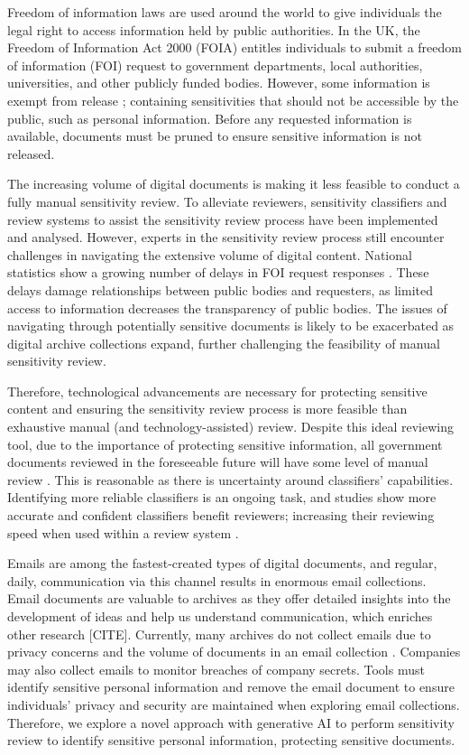 Freedom of information laws are used around the world to give individuals the legal right to access information held by public authorities. In the UK, the Freedom of Information Act 2000 (FOIA) \cite{FOIA:00} entitles individuals to submit a freedom of information (FOI) request to government departments, local authorities, universities, and other publicly funded bodies. However, some information is exempt from release \cite{FOIA:00}; containing sensitivities that should not be accessible by the public, such as personal information. Before any requested information is available, documents must be pruned to ensure sensitive information is not released.

The increasing volume of digital documents is making it less feasible to conduct a fully manual sensitivity review. To alleviate reviewers, sensitivity classifiers \cite{mcdonald2014towards, mcdonald2017enhancing, baron2022providing} and review systems \cite{narvala2022sensitivity} to assist the sensitivity review process have been implemented and analysed. However, experts in the sensitivity review process still encounter challenges in navigating the extensive volume of digital content. National statistics show a growing number of delays in FOI request responses \cite{SG:23, ONS:23}. These delays damage relationships between public bodies and requesters, as limited access to information decreases the transparency of public bodies. The issues of navigating through potentially sensitive documents is likely to be exacerbated as digital archive collections expand, further challenging the feasibility of manual sensitivity review.

Therefore, technological advancements are necessary for protecting sensitive content and ensuring the sensitivity review process is more feasible than exhaustive manual (and technology-assisted) review. Despite this ideal reviewing tool, due to the importance of protecting sensitive information, all government documents reviewed in the foreseeable future will have some level of manual review \cite{TNA:16}. This is reasonable as there is uncertainty around classifiers’ capabilities. Identifying more reliable classifiers is an ongoing task, and studies show more accurate and confident classifiers benefit reviewers; increasing their reviewing speed when used within a review system \cite{mcdonald2020accuracy}.

Emails are among the fastest-created types of digital documents, and regular, daily, communication via this channel results in enormous email collections. Email documents are valuable to archives as they offer detailed insights into the development of ideas and help us understand communication, which enriches other research [CITE]. Currently, many archives do not collect emails due to privacy concerns and the volume of documents in an email collection \cite{TFTAEA:18}. Companies may also collect emails to monitor breaches of company secrets. Tools must identify sensitive personal information and remove the email document to ensure individuals' privacy and security are maintained when exploring email collections. Therefore, we explore a novel approach with generative AI to perform sensitivity review to identify sensitive personal information, protecting sensitive documents.


